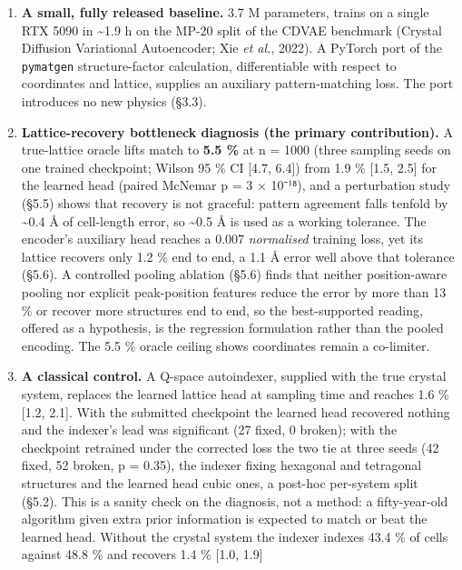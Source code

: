 \documentclass[
  11pt,
]{article}
\providecommand{\tightlist}{%
  \setlength{\itemsep}{0pt}\setlength{\parskip}{0pt}}
\begin{document}
\begin{enumerate}
\def\labelenumi{\arabic{enumi}.}
\tightlist
\item
  \textbf{A small, fully released baseline.} 3.7 M parameters, trains on
  a single RTX 5090 in \textasciitilde1.9 h on the MP-20 split of the
  CDVAE benchmark (Crystal Diffusion Variational Autoencoder; Xie
  \emph{et al.}, 2022). A PyTorch port of the \texttt{pymatgen}
  structure-factor calculation, differentiable with respect to
  coordinates and lattice, supplies an auxiliary pattern-matching loss.
  The port introduces no new physics (§3.3).
\item
  \textbf{Lattice-recovery bottleneck diagnosis (the primary
  contribution).} A true-lattice oracle lifts match to \textbf{5.5 \%}
  at n = 1000 (three sampling seeds on one trained checkpoint; Wilson 95
  \% CI {[}4.7, 6.4{]}) from 1.9 \% {[}1.5, 2.5{]} for the learned head
  (paired McNemar p = 3 × 10⁻¹⁸), and a perturbation study (§5.5) shows
  that recovery is not graceful: pattern agreement falls tenfold by
  \textasciitilde0.4 Å of cell-length error, so \textasciitilde0.5 Å is
  used as a working tolerance. The encoder's auxiliary head reaches a
  0.007 \emph{normalised} training loss, yet its lattice recovers only
  1.2 \% end to end, a 1.1 Å error well above that tolerance (§5.6). A
  controlled pooling ablation (§5.6) finds that neither position-aware
  pooling nor explicit peak-position features reduce the error by more
  than 13 \% or recover more structures end to end, so the
  best-supported reading, offered as a hypothesis, is the regression
  formulation rather than the pooled encoding. The 5.5 \% oracle ceiling
  shows coordinates remain a co-limiter.
\item
  \textbf{A classical control.} A Q-space autoindexer, supplied with the
  true crystal system, replaces the learned lattice head at sampling
  time and reaches 1.6 \% {[}1.2, 2.1{]}. With the submitted checkpoint
  the learned head recovered nothing and the indexer's lead was
  significant (27 fixed, 0 broken); with the checkpoint retrained under
  the corrected loss the two tie at three seeds (42 fixed, 52 broken, p
  = 0.35), the indexer fixing hexagonal and tetragonal structures and
  the learned head cubic ones, a post-hoc per-system split (§5.2). This
  is a sanity check on the diagnosis, not a method: a fifty-year-old
  algorithm given extra prior information is expected to match or beat
  the learned head. Without the crystal system the indexer indexes 43.4
  \% of cells against 48.8 \% and recovers 1.4 \% {[}1.0, 1.9{]}

\end{enumerate}
\end{document}
